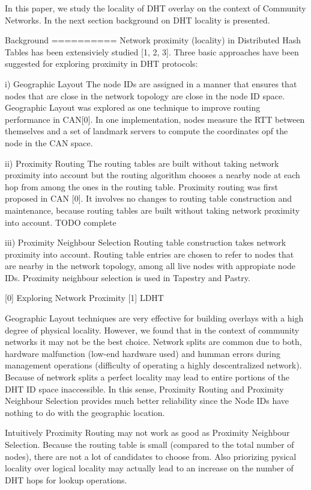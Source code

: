 In this paper, we study the locality of DHT overlay on the context of Community 
Networks. In the next section background on DHT locality is presented.


Background
==========
Network proximity (locality) in Distributed Hash Tables has been extensiviely studied [1, 2, 3]. 
Three basic approaches have been suggested for exploring proximity in DHT protocols:

i) Geographic Layout
The node IDs are assigned in a manner that ensures that nodes that are close in the 
network topology are close in the node ID space. Geographic Layout was explored as 
one technique to improve routing performance in CAN[0]. In one implementation, 
nodes measure the RTT between themselves and a set of landmark servers to compute 
the coordinates opf the node in the CAN space.

ii) Proximity Routing
The routing tables are built without taking network proximity into account but the 
routing algorithm chooses a nearby node at each hop from among the ones in the 
routing table. Proximity routing was first proposed in CAN [0]. It involves no 
changes to routing table construction and maintenance, because routing tables are 
built without taking network proximity into account. TODO complete

iii) Proximity Neighbour Selection
Routing table construction takes network proximity into account. Routing table 
entries are chosen to refer to nodes that are nearby in the network topology, 
among all live nodes with appropiate node IDs. Proximity neighbour selection is 
used in Tapestry and Pastry.

[0] Exploring Network Proximity
[1] LDHT

Geographic Layout techniques are very effective for building overlays with a 
high degree of physical locality. However, we found that in the context of 
community networks it may not be the best choice. Network splits are common due to both, 
hardware malfunction (low-end hardware used) and humman errors during management 
operations (difficulty of operating a highly descentralized network). Because of network 
splits a perfect locality may lead to entire portions of the DHT ID space inaccessible. 
In this sense, Proximity Routing and Proximity Neighbour Selection provides much better 
reliability since the Node IDs have nothing to do with the geographic location.

Intuitively Proximity Routing may not work as good as Proximity Neighbour Selection. 
Because the routing table is small (compared to the total number of nodes), there 
are not a lot of candidates to choose from. Also priorizing pysical locality over 
logical locality may actually lead to an increase on the number of DHT hops for 
lookup operations.

